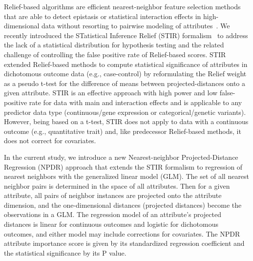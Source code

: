 \documentclass{bioinfo}
\begin{document}
Relief-based algorithms are efficient nearest-neighbor feature selection methods that are able to detect epistasis or statistical interaction effects in high-dimensional data without resorting to pairwise modeling of attributes~\citep{urbanowicz17b, kononenko97, mckinney09, robnik03}.
We recently introduced the STatistical Inference Relief (STIR) formalism~\citep{stir} to address the lack of a statistical distribution for hypothesis testing and the related challenge of controlling the false positive rate of Relief-based scores.
STIR extended Relief-based methods to compute statistical significance of attributes in dichotomous outcome data (e.g., case-control) by reformulating the Relief weight~\citep{mckinney13} as a pseudo t-test for the difference of means between projected-distances onto a given attribute.
STIR is an effective approach with high power and low false-positive rate for data with main and interaction effects and is applicable to any predictor data type (continuous/gene expression or categorical/genetic variants).
However, being based on a t-test, STIR does not apply to data with a continuous outcome (e.g., quantitative trait) and, like predecessor Relief-based methods, it does not correct for covariates.

In the current study, we introduce a new Nearest-neighbor Projected-Distance Regression (NPDR) approach that extends the STIR formalism to regression of nearest neighbors with the generalized linear model (GLM). The set of all nearest neighbor pairs is determined in the space of all attributes. Then for a given attribute, all pairs of neighbor instances are projected onto the attribute dimension, and the one-dimensional distances (projected distances) become the observations in a GLM.  
The regression model of an attribute's projected distances is linear for continuous outcomes and logistic for dichotomous outcomes, and either model may include corrections for covariates.
The NPDR attribute importance score is given by its standardized regression coefficient and the statistical significance by its P value.
\end{document}
